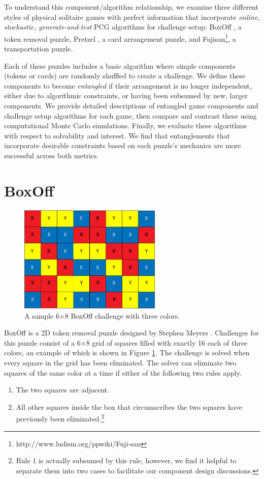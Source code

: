 \documentclass[journal]{IEEEtran}
\begin{document}
To understand this component/algorithm relationship, we examine three different styles of physical solitaire games with perfect information that incorporate {\it online, stochastic, generate-and-test} PCG algorithms for challenge setup: BoxOff \cite{BoxOffGAMES} , a token removal puzzle, Pretzel \cite{de1981pretzel} , a card arrangement puzzle, and Fujisan\footnote{http://www.ludism.org/ppwiki/Fuji-san}, a transportation puzzle.

Each of these puzzles includes a basic algorithm where simple components (tokens or cards) are randomly shuffled to create a challenge. We define these components to become {\it entangled} if their arrangement is no longer independent, either due to algorithmic constraints, or having been subsumed by new, larger components. We provide detailed descriptions of entangled game components and challenge setup algorithms for each game, then compare and contrast these using computational Monte Carlo simulations. Finally, we evaluate these algorithms with respect to solvability and interest. We find that entanglements that incorporate desirable constraints based on each puzzle's mechanics are more successful across both metrics.

%

\section{BoxOff}

\begin{figure}[t]
\centering
\includegraphics[width=6.8cm]{figure1.png}
\caption{A sample 6$\times$8 BoxOff challenge with three colors.}
\label{fig:boxoffbig}
\end{figure}
\noindent
BoxOff is a 2D token removal puzzle designed by Stephen Meyers  \cite{BoxOffGAMES}. Challenges for this puzzle consist of a 6$\times$8 grid of squares filled with exactly 16 each of three colors, an example of which is shown in 
Figure \ref{fig:boxoffbig}. The challenge is solved when every square in the grid has been eliminated.  The solver can eliminate two squares of the same color at a time if either of the following two rules apply.
\begin{enumerate}
    \item The two squares are adjacent.
    \item All other squares inside the box that circumscribes the two squares have previously been eliminated.\footnote{Rule 1 is actually subsumed by this rule, however, we find it helpful to separate them into two cases to facilitate our component design discussions.}
\end{enumerate}
\end{document}
